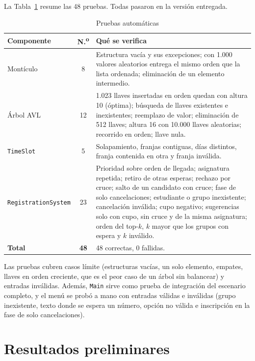 \documentclass[conference]{IEEEtran}
\begin{document}
La Tabla~\ref{tab:pruebas} resume las 48 pruebas. Todas pasaron en la versión entregada.

\begin{table}[htbp]
\caption{Pruebas automáticas}
\label{tab:pruebas}
\centering
\footnotesize
\begin{tabular}{@{}p{2.1cm} c p{4.6cm}@{}}
\toprule
\textbf{Componente} & \textbf{N.\textsuperscript{o}} & \textbf{Qué se verifica} \\
\midrule
Montículo & 8 & Estructura vacía y sus excepciones; con 1.000 valores aleatorios entrega el mismo orden que la lista ordenada; eliminación de un elemento intermedio. \\
Árbol AVL & 12 & 1.023 llaves insertadas en orden quedan con altura 10 (óptima); búsqueda de llaves existentes e inexistentes; reemplazo de valor; eliminación de 512 llaves; altura 16 con 10.000 llaves aleatorias; recorrido en orden; llave nula. \\
\texttt{TimeSlot} & 5 & Solapamiento, franjas contiguas, días distintos, franja contenida en otra y franja inválida. \\
\texttt{Registration\-System} & 23 & Prioridad sobre orden de llegada; asignatura repetida; retiro de otras esperas; rechazo por cruce; salto de un candidato con cruce; fase de solo cancelaciones; estudiante o grupo inexistente; cancelación inválida; cupo negativo; sugerencias solo con cupo, sin cruce y de la misma asignatura; orden del top-$k$, $k$ mayor que los grupos con espera y $k$ inválido. \\
\midrule
\textbf{Total} & \textbf{48} & 48 correctas, 0 fallidas. \\
\bottomrule
\end{tabular}
\end{table}

Las pruebas cubren casos límite (estructuras vacías, un solo elemento, empates, llaves en orden creciente, que es el peor caso de un árbol sin balancear) y entradas inválidas. Además, \texttt{Main} sirve como prueba de integración del escenario completo, y el menú se probó a mano con entradas válidas e inválidas (grupo inexistente, texto donde se espera un número, opción no válida e inscripción en la fase de solo cancelaciones).


\section{Resultados preliminares}
\end{document}
